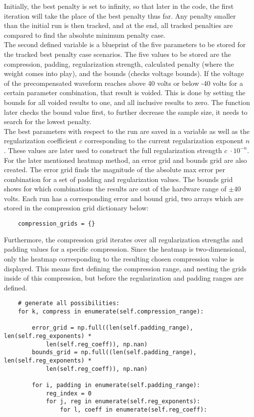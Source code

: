 \documentclass[11pt, a4paper]{article}
\theoremstyle{definition}
\numberwithin{equation}{section}
\begin{document}
Initially, the best penalty is set to infinity, so that later in the code, the first iteration will take the place of the best penalty thus far. Any penalty smaller than the initial run is then tracked, and at the end, all tracked penalties are compared to find the absolute minimum penalty case.
\\
The second defined variable is a blueprint of the five parameters to be stored for the tracked best penalty case scenarios. The five values to be stored are the compression, padding, regularization strength, calculated penalty (where the weight comes into play), and the bounds (checks voltage bounds). If the voltage of the precompensated waveform reaches above 40 volts or below -40 volts for a certain parameter combination, that result is voided. This is done by setting the bounds for all voided results to one, and all inclusive results to zero. The function later checks the bound value first, to further decrease the sample size, it needs to search for the lowest penalty.
\\
The best parameters with respect to the run are saved in a variable as well as the regularization coefficient $c$ corresponding to the current regularization exponent $n$. These values are later used to construct the full regularization strength $c \; \cdot 10^{-n}$.
\\
For the later mentioned heatmap method, an error grid and bounds grid are also created. The error grid finds the magnitude of the absolute max error per combination for a set of padding and regularization values. The bounds grid shows for which combinations the results are out of the hardware range of $\pm 40$ volts. Each run has a corresponding error and bound grid, two arrays which are stored in the compression grid dictionary below:

\begin{verbatim}
    compression_grids = {}
\end{verbatim}

Furthermore, the compression grid iterates over all regularization strengths and padding values for a specific compression. Since the heatmap is two-dimensional, only the heatmap corresponding to the resulting chosen compression value is displayed. This means first defining the compression range, and nesting the grids inside of this compression, but before the regularization and padding ranges are defined.

\begin{verbatim}
    # generate all possibilities:
    for k, compress in enumerate(self.compression_range):

        error_grid = np.full((len(self.padding_range), len(self.reg_exponents) * 
            len(self.reg_coeff)), np.nan)
        bounds_grid = np.full((len(self.padding_range), len(self.reg_exponents) * 
            len(self.reg_coeff)), np.nan)
        
        for i, padding in enumerate(self.padding_range):
            reg_index = 0
            for j, reg in enumerate(self.reg_exponents):
                for l, coeff in enumerate(self.reg_coeff):
\end{verbatim}
\end{document}
